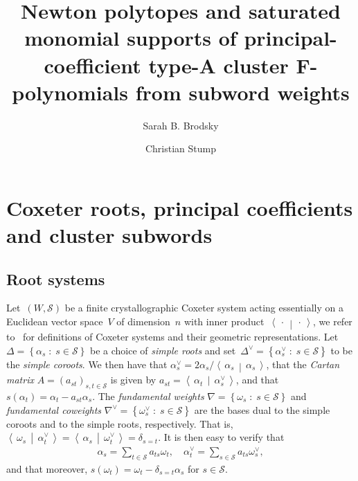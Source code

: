 \documentclass[10pt]{amsart}
\theoremstyle{definition}\newtheorem{rema}[theo]{Remark}\newtheorem{exem}[theo]{Example}
\newcommand{\Dfn}[1]{\emph{#1}}
\newcommand{\sref}{\mathcal{S}}
\newcommand{\set}[2]{\left\{ #1 \;:\; #2 \right\}}
\newcommand{\dotprod}[2]{\left\langle \, #1 \,\middle|\, #2 \, \right\rangle}
\begin{document}
\title{Newton polytopes and saturated monomial supports of principal-coefficient type-A cluster F-polynomials from subword weights}
\author{Sarah B. Brodsky \and Christian Stump}
\maketitle
\setcounter{section}{1}
\section{Coxeter roots, principal coefficients and cluster subwords}
\subsection{Root systems}\label{sec:rootsystem}

Let~$(W,\sref)$ be a finite crystallographic Coxeter system acting essentially on a Euclidean vector space~$V$ of dimension~$n$ with inner product~$\dotprod{\cdot}{\cdot}$, we refer to~\cite[Part~II]{Hum1990} for definitions of Coxeter systems and their geometric representations. Let $\Delta = \set{\alpha_s}{s \in \sref}$ be a choice of \Dfn{simple roots} and set~$\Delta^\vee = \set{\alpha_s^\vee}{s \in \sref}$ to be the \Dfn{simple coroots}. We then have that $\alpha_s^\vee = 2\alpha_s / \dotprod{\alpha_s}{\alpha_s}$, that the \Dfn{Cartan matrix} $A = (a_{st})_{s,t \in \sref}$ is given by $a_{st} = \dotprod{\alpha_t}{\alpha_s^\vee}$, and that $s(\alpha_t) = \alpha_t - a_{st} \alpha_s$. The \Dfn{fundamental weights} $\nabla = \set{\omega_s}{s \in \sref}$ and \Dfn{fundamental coweights} $\nabla^\vee = \set{\omega_s^\vee}{s \in \sref}$ are the bases dual to the simple coroots and to the simple roots, respectively. That is, $\dotprod{\omega_s}{\alpha_t^\vee} = \dotprod{\alpha_s}{\omega_t^\vee} = \delta_{s=t}$. It is then easy to verify that
\begin{align}
\alpha_s = \sum_{t \in \sref}a_{ts}\omega_t, \quad \alpha_t^\vee = \sum_{s \in \sref}a_{ts}\omega_s^\vee, \label{eq:rootweight}
\end{align}
and that moreover, $s(\omega_t) = \omega_t - \delta_{s=t}\alpha_s$ for $s \in \sref$.
\end{document}
